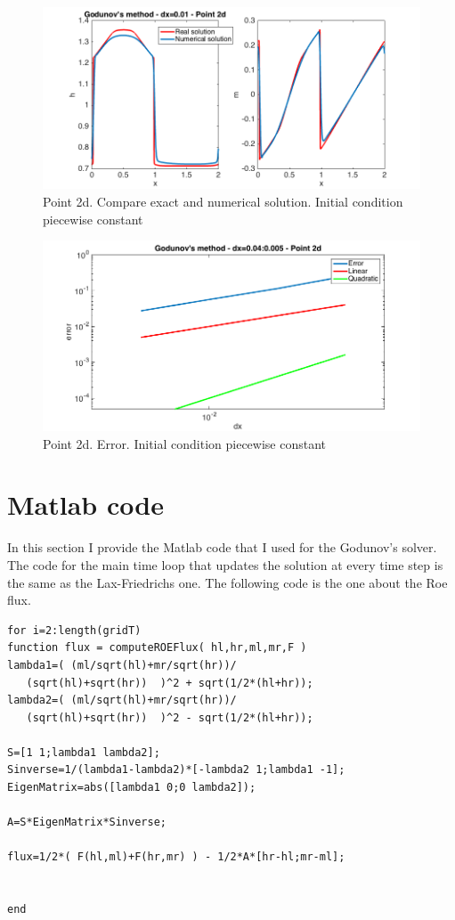 \documentclass[oneside,12pt]{book}  %
\theoremstyle{plain}
\theoremstyle{definition}
\theoremstyle{remark}
\numberwithin{equation}{chapter} %
\begin{document}
\begin{figure}[h]
\label{img:roe_2c_3_solution}
\centering
\includegraphics[scale=0.5]{Immagini/LF/2c-3-solution.png}
\caption{Point 2d. Compare exact and numerical solution. Initial
  condition piecewise constant}
\end{figure}

\begin{figure}[h]
\label{img:roe_2c_3_error}
\centering
\includegraphics[scale=0.5]{Immagini/LF/2c-3-error.png}
\caption{Point 2d. Error. Initial condition piecewise constant}
\end{figure}

\FloatBarrier
\section{Matlab code}
In this section I provide the Matlab code that I used for the
Godunov's solver. The code for the main time loop that
updates the solution at every time step is the same as the
Lax-Friedrichs one. The following code is the one about the Roe flux.
\begin{lstlisting}[frame=single]for i=2:length(gridT)
function flux = computeROEFlux( hl,hr,ml,mr,F )
lambda1=( (ml/sqrt(hl)+mr/sqrt(hr))/
   (sqrt(hl)+sqrt(hr))  )^2 + sqrt(1/2*(hl+hr));
lambda2=( (ml/sqrt(hl)+mr/sqrt(hr))/
   (sqrt(hl)+sqrt(hr))  )^2 - sqrt(1/2*(hl+hr));

S=[1 1;lambda1 lambda2];
Sinverse=1/(lambda1-lambda2)*[-lambda2 1;lambda1 -1];
EigenMatrix=abs([lambda1 0;0 lambda2]);

A=S*EigenMatrix*Sinverse;

flux=1/2*( F(hl,ml)+F(hr,mr) ) - 1/2*A*[hr-hl;mr-ml];


end
\end{lstlisting}
\end{document}
